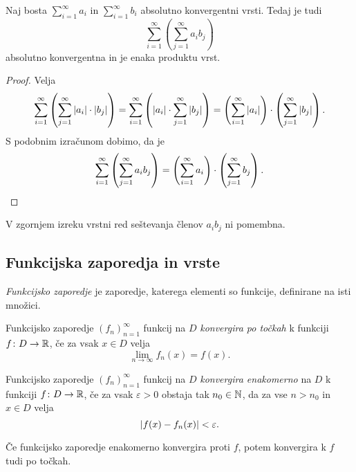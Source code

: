 \documentclass[12pt, a4paper]{article}
\begin{document}
\begin{izrek}
Naj bosta $\displaystyle\sum_{i=1}^\infty a_i$ in $\displaystyle\sum_{i=1}^\infty b_i$ absolutno konvergentni vrsti. Tedaj je tudi
\[
\sum_{i=1}^\infty\left(\sum_{j=1}^\infty a_ib_j\right)
\]
absolutno konvergentna in je enaka produktu vrst.
\end{izrek}

\begin{proof}
Velja
\[
\sum_{i=1}^\infty\left(\sum_{j=1}^\infty \left\lvert a_i\right\rvert\cdot\left\lvert b_j\right\rvert\right)=\sum_{i=1}^\infty\left(\left\lvert a_i\right\rvert\cdot\sum_{j=1}^\infty \left\lvert b_j\right\rvert\right)=\left(\sum_{i=1}^\infty \left\lvert a_i\right\rvert\right)\cdot\left(\sum_{j=1}^\infty \left\lvert b_j\right\rvert\right).
\]
S podobnim izračunom dobimo, da je
\[
\sum_{i=1}^\infty\left(\sum_{j=1}^\infty a_i b_j\right)=\left(\sum_{i=1}^\infty a_i\right)\cdot\left(\sum_{j=1}^\infty b_j\right).\qedhere
\]
\end{proof}

\begin{opomba}
V zgornjem izreku vrstni red seštevanja členov $a_ib_j$ ni pomembna.
\end{opomba}

\newpage

\subsection{Funkcijska zaporedja in vrste}

\begin{definicija}
\emph{Funkcijsko zaporedje} je zaporedje, katerega elementi so funkcije, definirane na isti množici.
\end{definicija}

\begin{definicija}
Funkcijsko zaporedje $(f_n)_{n=1}^\infty$ funkcij na $D$ \emph{konvergira po točkah} k funkciji $f\colon D\to\mathbb{R}$, če za vsak $x\in D$ velja
\[
\lim_{n\to\infty} f_n(x)=f(x).
\]
\end{definicija}

\begin{definicija}
Funkcijsko zaporedje $(f_n)_{n=1}^\infty$ funkcij na $D$ \emph{konvergira enakomerno} na $D$ k funkciji $f\colon D\to\mathbb{R}$, če za vsak $\varepsilon>0$ obstaja tak $n_0\in\mathbb{N}$, da za vse $n>n_0$ in $x\in D$ velja
\[
\left\lvert f(x)-f_n(x)\right\rvert<\varepsilon.
\]
\end{definicija}

\begin{posledica}
Če funkcijsko zaporedje enakomerno konvergira proti $f$, potem konvergira k $f$ tudi po točkah.
\end{posledica}
\end{document}
